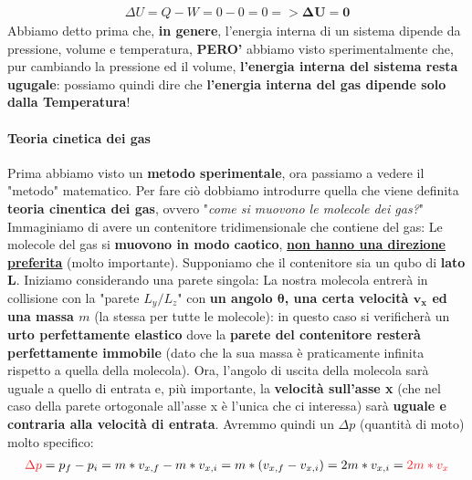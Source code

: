                     \begin{align*}
                        \Delta U = Q-W = 0-0 = 0 => \mathbf{\Delta U = 0}
                    \end{align*}
                    Abbiamo detto prima che, \textbf{in genere}, l'energia interna di un sistema dipende da pressione, volume e temperatura, \textbf{PERO'} abbiamo visto sperimentalmente che, pur cambiando la pressione ed il volume, \textbf{l'energia interna del sistema resta ugugale}: possiamo quindi dire che \textbf{l'energia interna del gas dipende solo dalla Temperatura}!


                \paragraph{Teoria cinetica dei gas}
                    Prima abbiamo visto un \textbf{metodo sperimentale}, ora passiamo a vedere il "metodo" matematico. Per fare ciò dobbiamo introdurre quella che viene definita \textbf{teoria cinentica dei gas}, ovvero "\textit{come si muovono le molecole dei gas?}" Immaginiamo di avere un contenitore tridimensionale che contiene del gas:
                    Le molecole del gas si \textbf{muovono in modo caotico}, \textbf{\underline{non hanno una direzione preferita}} (molto importante). Supponiamo che il contenitore sia un qubo di \textbf{lato $\mathbf{L}$}. Iniziamo considerando una parete singola:
                    La nostra molecola entrerà in collisione con la "parete $L_y/L_z$" con \textbf{un angolo $\mathbf{\theta}$, una certa velocità $\mathbf{v_x}$ ed una massa $m$} (la stessa per tutte le molecole): in questo caso si verificherà un \textbf{urto perfettamente elastico} dove la \textbf{parete del contenitore resterà perfettamente immobile} (dato che la sua massa è praticamente infinita rispetto a quella della molecola). Ora, l'angolo di uscita della molecola sarà uguale a quello di entrata e, più importante, la \textbf{velocità sull'asse x} (che nel caso della parete ortogonale all'asse x è l'unica che ci interessa) sarà \textbf{uguale e contraria alla velocità di entrata}. Avremmo quindi un $\Delta p$ (quantità di moto) molto specifico:
                    \begin{align*}
                        \textcolor{Red}{\Delta p} = p_f-p_i = m*v_{x, f}-m*v_{x, i}=m*(v_{x, f}-v_{x, i}) =2m*v_{x, i}= \textcolor{Red}{2m*v_{x}}
                    \end{align*}
